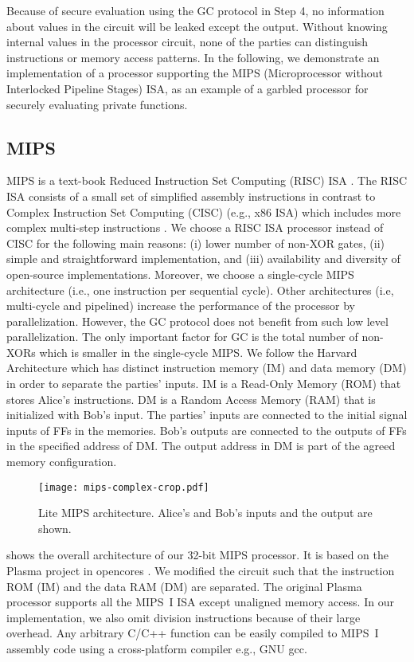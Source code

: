 Because of secure evaluation using the GC protocol in Step 4, no information about values in the circuit will be leaked except the output.
Without knowing internal values in the processor circuit, none of the parties can distinguish instructions or memory access patterns.
In the following, we demonstrate an implementation of a processor supporting the MIPS (Microprocessor without Interlocked Pipeline Stages) ISA, as an example of a garbled processor for securely evaluating private functions.

\subsection{MIPS}
MIPS is a text-book Reduced Instruction Set Computing (RISC) ISA \cite{kane1992mips}.
The RISC ISA consists of a small set of simplified assembly instructions in contrast to Complex Instruction Set Computing (CISC) (e.g., x86 ISA) which includes more complex multi-step instructions \cite{hennessy2012computer}.
We choose a RISC ISA processor instead of CISC for the following main reasons: (i) lower number of non-XOR gates, (ii) simple and straightforward implementation, and (iii) availability and diversity of open-source implementations.
Moreover, we choose a single-cycle MIPS architecture (i.e., one instruction per sequential cycle).
Other architectures (i.e, multi-cycle and pipelined) increase the performance of the processor by parallelization.
However, the GC protocol does not benefit from such low level parallelization.
The only important factor for GC is the total number of non-XORs which is smaller in the single-cycle MIPS.
We follow the Harvard Architecture which has distinct instruction memory (IM) and data memory (DM) in order to separate the parties' inputs.
IM is a Read-Only Memory (ROM) that stores Alice's instructions.
DM is a Random Access Memory (RAM) that is initialized with Bob's input.
The parties' inputs are connected to the initial signal inputs of FFs in the memories.
Bob's outputs are connected to the outputs of FFs in the specified address of DM.
The output address in DM is part of the agreed memory configuration.

\begin{figure*}[t!]
\centering
\texttt{[image: mips-complex-crop.pdf]}
\caption{Lite MIPS architecture.
  Alice's and Bob's inputs and the output are shown.}\label{figure:mips}
\end{figure*}

 shows the overall architecture of our 32-bit MIPS processor.
It is based on the Plasma project in opencores \cite{rhoads2006plasma}.
We modified the circuit such that the instruction ROM (IM) and the data RAM (DM) are separated.
The original Plasma processor supports all the MIPS~I ISA except unaligned memory access.
In our implementation, we also omit division instructions because of their large overhead.
Any arbitrary C/C++ function can be easily compiled to MIPS~I assembly code using a cross-platform compiler e.g., GNU gcc.

